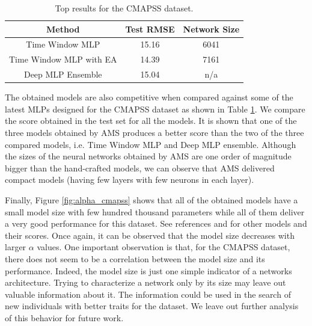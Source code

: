 \documentclass[preprint,12pt]{elsarticle}%
\begin{document}
\begin{table}[H]
\begin{center}
\begin{tabular}{| c | c | c |}
\hline
Method & Test RMSE & Network Size \\
\hline
Time Window MLP \cite{Lim2016} & 15.16 & 6041\\
Time Window MLP with EA \cite{Laredo2018} & 14.39 & 7161\\
Deep MLP Ensemble \cite{Zhang2016} & 15.04 &  n/a \\
\hline
\end{tabular}
\end{center}
\caption{Top results for the CMAPSS dataset.}
\label{table:CMAPSS_results_top}
\end{table}

The obtained models are also competitive when compared against some of the latest MLPs designed for the CMAPSS dataset as shown in Table \ref{table:CMAPSS_results_top}. We compare the score obtained in the test set for all the models. It is shown that one of the three models obtained by AMS produces a better score than the two of the three compared models, i.e. Time Window MLP and Deep MLP ensemble. Although the sizes of the neural networks obtained by AMS are one order of magnitude bigger than the hand-crafted models, we can observe that AMS delivered compact models (having few layers with few neurons in each layer).

Finally, Figure \ref{fig:alpha_cmapss} shows that all of the obtained models have a small model size with few hundred thousand parameters while all of them deliver a very good performance for this dataset. See references \cite{Laredo2018} and \cite{Li2018} for other models and their scores. Once again, it can be observed that the model size decreases with larger $\alpha$ values. One important observation is that, for the CMAPSS dataset, there does not seem to be a correlation between the model size and its performance. Indeed, the model size is just one simple indicator of a networks architecture. Trying to characterize a network only by its size may leave out valuable information about it. The information could be used in the search of new individuals with better traits for the dataset. We leave out further analysis of this behavior for future work.
\end{document}
